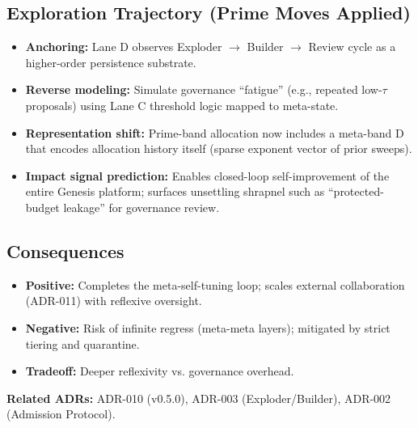 \documentclass[11pt]{article}
\begin{document}
\subsection{Exploration Trajectory (Prime Moves Applied)}
\begin{itemize}
    \item \textbf{Anchoring:} Lane D observes Exploder $\to$ Builder $\to$ Review cycle as a higher-order persistence substrate.
    \item \textbf{Reverse modeling:} Simulate governance ``fatigue'' (e.g., repeated low-$\tau$ proposals) using Lane C threshold logic mapped to meta-state.
    \item \textbf{Representation shift:} Prime-band allocation now includes a meta-band D that encodes allocation history itself (sparse exponent vector of prior sweeps).
    \item \textbf{Impact signal prediction:} Enables closed-loop self-improvement of the entire Genesis platform; surfaces unsettling shrapnel such as ``protected-budget leakage'' for governance review.
\end{itemize}

\subsection{Consequences}
\begin{itemize}
    \item \textbf{Positive:} Completes the meta-self-tuning loop; scales external collaboration (ADR-011) with reflexive oversight.
    \item \textbf{Negative:} Risk of infinite regress (meta-meta layers); mitigated by strict tiering and quarantine.
    \item \textbf{Tradeoff:} Deeper reflexivity vs. governance overhead.
\end{itemize}

\textbf{Related ADRs:} ADR-010 (v0.5.0), ADR-003 (Exploder/Builder), ADR-002 (Admission Protocol).
\end{document}

